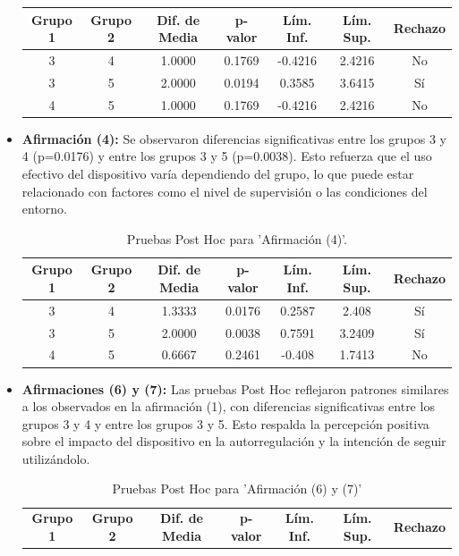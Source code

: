 \documentclass[a4paper,fleqn]{cas-sc}
\begin{document}
\begin{itemize}
\begin{table}[ht]
\begin{tabularx}{0.75\textwidth}{ccccccc}
						\hline
						\textbf{Grupo 1} & \textbf{Grupo 2} & \textbf{Dif. de Media} & \textbf{p-valor} & \textbf{Lím. Inf.} & \textbf{Lím. Sup.} & \textbf{Rechazo} \\
						\hline
						3 & 4 & 1.0000 & 0.1769 & -0.4216 & 2.4216 & No \\
						3 & 5 & 2.0000 & 0.0194 & 0.3585 & 3.6415 & Sí \\
						4 & 5 & 1.0000 & 0.1769 & -0.4216 & 2.4216 & No \\
						\hline
					\end{tabularx}
					\label{table:posthoc_3}
				\end{table}
				
				\item \textbf{Afirmación (4):} Se observaron diferencias significativas entre los grupos 3 y 4 (p=0.0176) y entre los grupos 3 y 5 (p=0.0038). Esto refuerza que el uso efectivo del dispositivo varía dependiendo del grupo, lo que puede estar relacionado con factores como el nivel de supervisión o las condiciones del entorno.
				\begin{table}[ht]
					\centering
					\caption{Pruebas Post Hoc para 'Afirmación (4)'.}
					\begin{tabularx}{0.75\textwidth}{ccccccc}
						\hline
						\textbf{Grupo 1} & \textbf{Grupo 2} & \textbf{Dif. de Media} & \textbf{p-valor} & \textbf{Lím. Inf.} & \textbf{Lím. Sup.} & \textbf{Rechazo} \\
						\hline
						3 & 4 & 1.3333 & 0.0176 & 0.2587 & 2.408 & Sí \\
						3 & 5 & 2.0000 & 0.0038 & 0.7591 & 3.2409 & Sí \\
						4 & 5 & 0.6667 & 0.2461 & -0.408 & 1.7413 & No \\
						\hline
					\end{tabularx}
					\label{table:posthoc_4}
				\end{table}
				\item \textbf{Afirmaciones (6) y (7):} Las pruebas Post Hoc reflejaron patrones similares a los observados en la afirmación (1), con diferencias significativas entre los grupos 3 y 4 y entre los grupos 3 y 5. Esto respalda la percepción positiva sobre el impacto del dispositivo en la autorregulación y la intención de seguir utilizándolo.
				\begin{table}[ht]
					\centering
					\caption{Pruebas Post Hoc para 'Afirmación (6) y (7)'}
					\begin{tabularx}{0.75\textwidth}{ccccccc}
						\hline
						\textbf{Grupo 1} & \textbf{Grupo 2} & \textbf{Dif. de Media} & \textbf{p-valor} & \textbf{Lím. Inf.} & \textbf{Lím. Sup.} & \textbf{Rechazo} \\

\end{tabularx}
\end{table}
\end{itemize}
\end{document}
